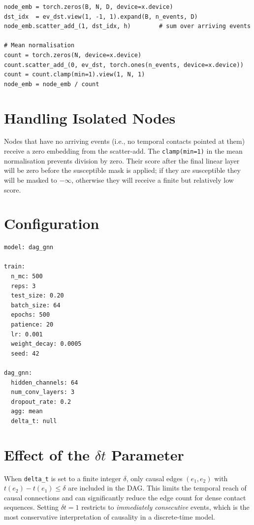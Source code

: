 \documentclass[12pt,a4paper]{report}
\begin{document}
\begin{lstlisting}[caption={DAG-GNN readout: events to nodes.}]
node_emb = torch.zeros(B, N, D, device=x.device)
dst_idx  = ev_dst.view(1, -1, 1).expand(B, n_events, D)
node_emb.scatter_add_(1, dst_idx, h)        # sum over arriving events

# Mean normalisation
count = torch.zeros(N, device=x.device)
count.scatter_add_(0, ev_dst, torch.ones(n_events, device=x.device))
count = count.clamp(min=1).view(1, N, 1)
node_emb = node_emb / count
\end{lstlisting}

\section{Handling Isolated Nodes}

Nodes that have no arriving events (i.e., no temporal contacts pointed at them)
receive a zero embedding from the scatter-add. The \texttt{clamp(min=1)} in the
mean normalisation prevents division by zero. Their score after the final linear
layer will be zero before the susceptible mask is applied; if they are
susceptible they will be masked to $-\infty$, otherwise they will receive a
finite but relatively low score.

\section{Configuration}

\begin{lstlisting}[language=bash,caption={DAG-GNN config (\texttt{exp/france\_office/dag\_gnn.yml}).}]
model: dag_gnn

train:
  n_mc: 500
  reps: 3
  test_size: 0.20
  batch_size: 64
  epochs: 500
  patience: 20
  lr: 0.001
  weight_decay: 0.0005
  seed: 42

dag_gnn:
  hidden_channels: 64
  num_conv_layers: 3
  dropout_rate: 0.2
  agg: mean
  delta_t: null
\end{lstlisting}

\section{Effect of the $\delta t$ Parameter}

When \texttt{delta\_t} is set to a finite integer $\delta$, only causal edges
$(e_1, e_2)$ with $t(e_2) - t(e_1) \leq \delta$ are included in the DAG. This
limits the temporal reach of causal connections and can significantly reduce the
edge count for dense contact sequences. Setting $\delta t = 1$ restricts to
\emph{immediately consecutive} events, which is the most conservative
interpretation of causality in a discrete-time model.
\end{document}
